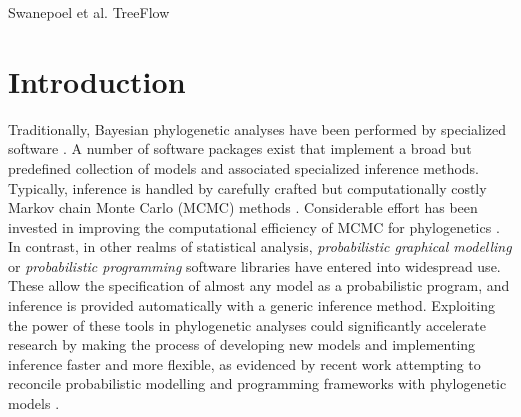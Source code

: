 \documentclass[oupdraft]{sysbio_sse}
\let\cite\citep
\begin{document}
\markboth%
{Swanepoel et al.}
{TreeFlow}

\maketitle

\begin{abstract}
    {Probabilistic modelling frameworks are powerful tools for statistical modelling and inference. They are not immediately generalizable to phylogenetic problems due to the particular computational properties of the phylogenetic tree object. TreeFlow is a software library for probabilistic modelling and automatic differentiation with phylogenetic trees. It embeds phylogenetic trees in the TensorFlow Probability framework, and implements inference algorithms for phylogenetic models given a fixed tree topology. We demonstrate how TreeFlow can be used to quickly implement and assess new models. We also show that it provides reasonable performance for gradient-based inference algorithms compared to specialized computational libraries for phylogenetics.
}
    {phylogenetics; Bayesian inference; probabilistic modelling; variational inference}
\end{abstract}
\newline


\section{Introduction}

Traditionally, Bayesian phylogenetic analyses have been performed by specialized software \cite{huelsenbeck2001mrbayes, lartillot2009phylobayes, drummond2012bayesian}. A number of software packages exist that implement a broad but predefined collection of models and associated specialized inference methods. Typically, inference is handled by carefully crafted but computationally costly Markov chain Monte Carlo (MCMC) methods \cite{metropolis1953equation, hastings1970monte}. Considerable effort has been invested in improving the computational efficiency of MCMC for phylogenetics \cite{mateiu2006inferring, lakner2008efficiency, hohna2012guided, zhang2020improving}. In contrast, in other realms of statistical analysis, \textit{probabilistic graphical modelling} or \textit{probabilistic programming} software libraries have entered into widespread use. These allow the specification of almost any model as a probabilistic program, and inference is provided automatically with a generic inference method. Exploiting the power of these tools in phylogenetic analyses could significantly accelerate research by making the process of developing new models and implementing inference faster and more flexible, as evidenced by recent work attempting to reconcile probabilistic modelling and programming frameworks with phylogenetic models \cite{fourment2019evaluating, ronquist2021universal}.
\end{document}
